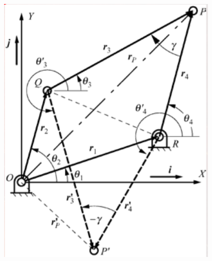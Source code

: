 \documentclass[11pt]{article}
\begin{document}
\begin{center}
\includegraphics[width=.9\linewidth]{./images/4-bar-linkage-vector-loop-example-closure-equation.png}
\end{center}

 \newpage
\end{document}
